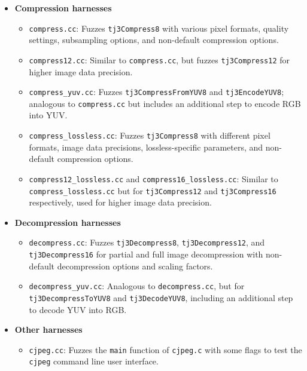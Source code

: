 \documentclass[12pt]{article}
\begin{document}
\begin{itemize}
  \item \textbf{Compression harnesses}
  \begin{itemize}
    \item \texttt{compress.cc}: Fuzzes \texttt{tj3Compress8} with various pixel formats, quality settings, subsampling options, and non-default compression options.
    \item \texttt{compress12.cc}: Similar to \texttt{compress.cc}, but fuzzes \texttt{tj3Compress12} for higher image data precision.
    \item \texttt{compress\_yuv.cc}: Fuzzes \texttt{tj3CompressFromYUV8} and \texttt{tj3EncodeYUV8}; analogous to \texttt{compress.cc} but includes an additional step to encode RGB into YUV.
    \item \texttt{compress\_lossless.cc}: Fuzzes \texttt{tj3Compress8} with different pixel formats, image data precisions, lossless-specific parameters, and non-default compression options.
    \item \texttt{compress12\_lossless.cc} and \texttt{compress16\_lossless.cc}: Similar to \texttt{compress\_lossless.cc} but for \texttt{tj3Compress12} and \texttt{tj3Compress16} respectively, used for higher image data precision.
  \end{itemize}

  \item \textbf{Decompression harnesses}
  \begin{itemize}
    \item \texttt{decompress.cc}: Fuzzes \texttt{tj3Decompress8}, \texttt{tj3Decompress12}, and \texttt{tj3Decompress16} for partial and full image decompression with non-default decompression options and scaling factors.
    \item \texttt{decompress\_yuv.cc}: Analogous to \texttt{decompress.cc}, but for \texttt{tj3DecompressToYUV8} and \texttt{tj3DecodeYUV8}, including an additional step to decode YUV into RGB.
  \end{itemize}

\item \textbf{Other harnesses}
  \begin{itemize}
    \item \texttt{cjpeg.cc}: Fuzzes the \texttt{main} function of \texttt{cjpeg.c} with some flags to test the \texttt{cjpeg} command line user interface.
  \end{itemize}
\end{itemize}
\end{document}

